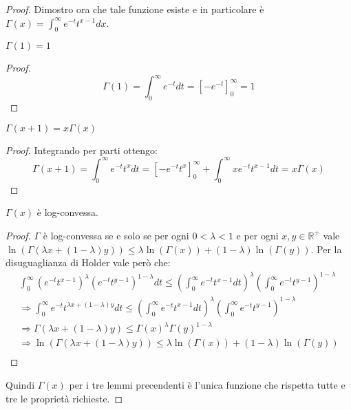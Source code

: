 \begin{proof}
Dimostro ora che tale funzione esiste e in particolare è 
$\Gamma(x)=\int_0^{\infty}{e^{-t}t^{x-1}dx}$.
\begin{lemma}
 $\Gamma(1)=1$
\end{lemma}
\begin{proof}
       \begin{equation*}
       \Gamma(1)=\int_0^{\infty}{e^{-t}dt}=\left[-e^{-t}\right]_0^{\infty}=1
       \end{equation*}
\end{proof}
\begin{lemma}
 $\Gamma(x+1)=x\Gamma(x)$
\end{lemma}
\begin{proof}
       Integrando per parti ottengo:
       \begin{equation*} 
       \Gamma(x+1)=\int_0^{\infty}{e^{-t}t^xdt}=\left[-e^{-t}t^x\right]_0^{\infty}+\int_0^{\infty}xe^{-t}t^{x-1}dt=x\Gamma(x)
       \end{equation*}
\end{proof}
\begin{lemma}
 \label{GammaLogConvessa}
 $\Gamma(x)$ è log-convessa.
\end{lemma}
\begin{proof}
       $\Gamma$ è log-convessa se e solo se per ogni $0<\lambda < 1$ e per ogni $x,y \in \mathbb{R}^+$ vale 
       $\ln(\Gamma(\lambda x+(1-\lambda)y))\le \lambda \ln(\Gamma(x))+(1-\lambda)\ln(\Gamma(y))$.
       Per la disuguaglianza di Holder vale però che:
       \begin{gather*}
       \int_0^{\infty}{(e^{-t}t^{x-1})^\lambda (e^{-t}t^{y-1})^{1-\lambda}dt} \le 
       \left(\int_0^{\infty}{e^{-t}t^{x-1}dt}\right)^\lambda \left(\int_0^{\infty}{e^{-t}t^{y-1}}\right)^{1-\lambda}\\
       \Longrightarrow \int_0^{\infty}{e^{-t}t^{\lambda x +(1-\lambda)y}dt} \le 
       \left(\int_0^{\infty}{e^{-t}t^{x-1}dt}\right)^\lambda \left(\int_0^{\infty}{e^{-t}t^{y-1}}\right)^{1-\lambda}\\
       \Longrightarrow \Gamma(\lambda x+(1-\lambda)y) \le \Gamma(x)^\lambda\Gamma(y)^{1-\lambda}\\
       \Longrightarrow \ln(\Gamma(\lambda x+(1-\lambda)y)) \le \lambda\ln(\Gamma(x))+(1-\lambda)\ln(\Gamma(y))\\
       \end{gather*}
\end{proof}

Quindi $\Gamma(x)$ per i tre lemmi precendenti è l'unica funzione che rispetta tutte e tre le proprietà richieste.
\end{proof}
